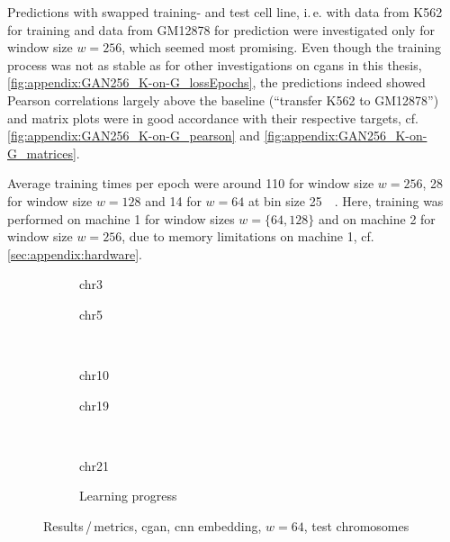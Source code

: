 Predictions with swapped training- and test cell line, i.\,e. with data from K562 for training and data from GM12878 for prediction 
were investigated only for window size $w=256$, which seemed most promising. 
Even though the training process was not as stable as for other investigations on \acrshort{cgan}s in this thesis, \cref{fig:appendix:GAN256_K-on-G_lossEpochs}, 
the predictions indeed showed Pearson correlations largely above the baseline (``transfer K562 to GM12878'') 
and matrix plots were in good accordance with their respective targets, cf. \cref{fig:appendix:GAN256_K-on-G_pearson} and \ref{fig:appendix:GAN256_K-on-G_matrices}.

Average training times per epoch were around \SI{110}{\min} for window size $w=256$,
\SI{28}{\min} for window size $w=128$  and \SI{14}{\min} for $w=64$ at bin size \SI{25}{\kilo\bp}.
Here, training was performed on machine 1 for window sizes $w=\{64,128\}$ and on machine 2 for window size $w=256$,
due to memory limitations on machine 1, cf. \cref{sec:appendix:hardware}.
\begin{figure}[p] %
    \begin{subfigure}{0.45\textwidth}
        \scriptsize
        \caption{chr3}
    \end{subfigure} \hfill
    \begin{subfigure}{0.45\textwidth}
        \scriptsize
        \caption{chr5}
    \end{subfigure}\\[5mm]
    \begin{subfigure}{0.45\textwidth}
        \scriptsize
        \caption{chr10}
    \end{subfigure}\hfill
    \begin{subfigure}{0.45\textwidth}
        \scriptsize
        \caption{chr19}
    \end{subfigure}\\[3mm]
    \begin{subfigure}{0.45\textwidth}
        \scriptsize
        \caption{chr21}
    \end{subfigure} \hfill
    \begin{subfigure}{0.45\textwidth}
        \scriptsize
        \caption{Learning progress} \label{fig:results:cGAN64_lossEpochs}
    \end{subfigure}
    \caption{Results\,/\,metrics, \acrshort{cgan}, \acrshort{cnn} embedding, $w=64$, test chromosomes}   \label{fig:results:cGAN64_pearson}
\end{figure}
